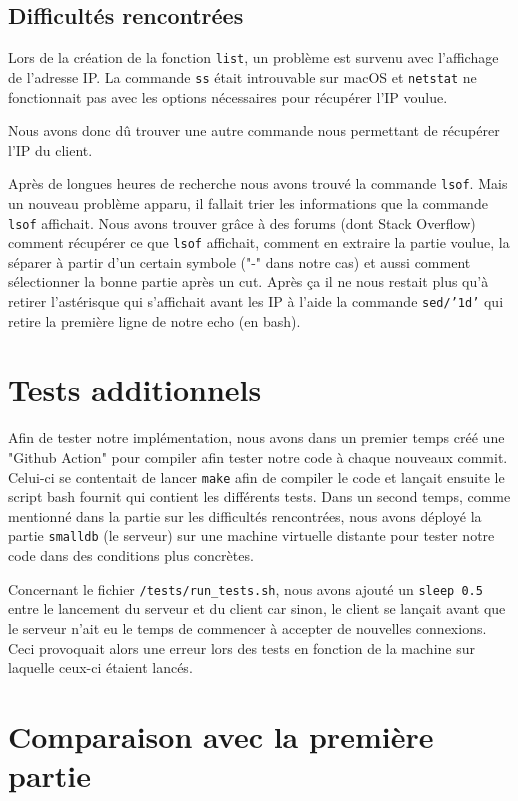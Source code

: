 \documentclass[utf8]{article}
\begin{document}
\subsection{Difficultés rencontrées}

Lors de la création de la fonction \texttt{list}, un problème est survenu avec l'affichage de l'adresse IP. La commande \texttt{ss} était introuvable sur macOS et \texttt{netstat} ne fonctionnait pas avec les options nécessaires pour récupérer l'IP voulue.

Nous avons donc dû trouver une autre commande nous permettant de récupérer l'IP du client.

Après de longues heures de recherche nous avons trouvé la commande \texttt{lsof}. Mais un nouveau problème apparu, il fallait trier les informations que la commande \texttt{lsof} affichait. Nous avons trouver grâce à des forums (dont Stack Overflow) comment récupérer ce que \texttt{lsof} affichait, comment en extraire la partie voulue, la séparer à partir d'un certain symbole ("-" dans notre cas) et aussi comment sélectionner la bonne partie après un cut. Après ça il ne nous restait plus qu'à retirer l'astérisque qui s'affichait avant les IP à l'aide la commande \texttt{sed/'1d'} qui retire la première ligne de notre echo (en bash).

\section{Tests additionnels}

Afin de tester notre implémentation, nous avons dans un premier temps créé une "Github Action" pour compiler afin tester notre code à chaque nouveaux commit. Celui-ci se contentait de lancer \texttt{make} afin de compiler le code et lançait ensuite le script bash fournit qui contient les différents tests. Dans un second temps, comme mentionné dans la partie sur les difficultés rencontrées, nous avons déployé la partie \texttt{smalldb} (le serveur) sur une machine virtuelle distante pour tester notre code dans des conditions plus concrètes.

Concernant le fichier \texttt{/tests/run\_tests.sh}, nous avons ajouté un \texttt{sleep 0.5} entre le lancement du serveur et du client car sinon, le client se lançait avant que le serveur n'ait eu le temps de commencer à accepter de nouvelles connexions. Ceci provoquait alors une erreur lors des tests en fonction de la machine sur laquelle ceux-ci étaient lancés.

\section{Comparaison avec la première partie}
\end{document}
